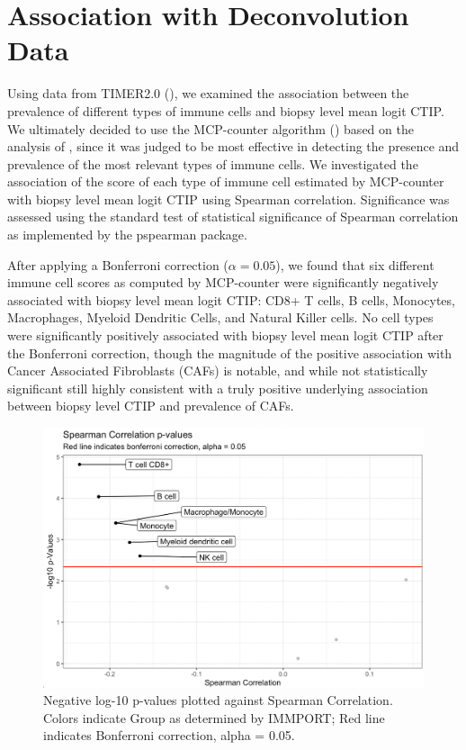 \documentclass[
]{book}
\begin{document}
\hypertarget{association-with-deconvolution-data}{%
\chapter{Association with Deconvolution Data}\label{association-with-deconvolution-data}}

Using data from TIMER2.0 (\citet{TIMER20}), we examined the association between the prevalence of different types of immune cells and biopsy level mean logit CTIP. We ultimately decided to use the MCP-counter algorithm (\citet{Becht16}) based on the analysis of \citet{Sturm19}, since it was judged to be most effective in detecting the presence and prevalence of the most relevant types of immune cells. We investigated the association of the score of each type of immune cell estimated by MCP-counter with biopsy level mean logit CTIP using Spearman correlation. Significance was assessed using the standard test of statistical significance of Spearman correlation as implemented by the pspearman package.

After applying a Bonferroni correction (\(\alpha = 0.05\)), we found that six different immune cell scores as computed by MCP-counter were significantly negatively associated with biopsy level mean logit CTIP: CD8+ T cells, B cells, Monocytes, Macrophages, Myeloid Dendritic Cells, and Natural Killer cells. No cell types were significantly positively associated with biopsy level mean logit CTIP after the Bonferroni correction, though the magnitude of the positive association with Cancer Associated Fibroblasts (CAFs) is notable, and while not statistically significant still highly consistent with a truly positive underlying association between biopsy level CTIP and prevalence of CAFs.

\begin{figure}

{\centering \includegraphics[width=1\linewidth]{Figures/MCP Spearman Volcano} 

}

\caption{Negative log-10 p-values plotted against Spearman Correlation. Colors indicate Group as determined by IMMPORT; Red line indicates Bonferroni correction, alpha = 0.05.}\label{fig:05}
\end{figure}
\end{document}
